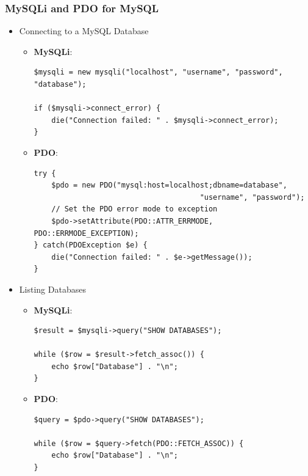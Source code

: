\documentclass[11pt]{article}
\begin{document}
\subsubsection{MySQLi and PDO for MySQL}
\label{sec:org78cc2f3}
\begin{itemize}
\item Connecting to a MySQL Database
\label{sec:org22497bb}
\begin{itemize}
\item \textbf{MySQLi}:

\begin{verbatim}
$mysqli = new mysqli("localhost", "username", "password", "database");

if ($mysqli->connect_error) {
    die("Connection failed: " . $mysqli->connect_error);
}
\end{verbatim}

\item \textbf{PDO}:

\begin{verbatim}
try {
    $pdo = new PDO("mysql:host=localhost;dbname=database",
                                      "username", "password");
    // Set the PDO error mode to exception
    $pdo->setAttribute(PDO::ATTR_ERRMODE, PDO::ERRMODE_EXCEPTION);
} catch(PDOException $e) {
    die("Connection failed: " . $e->getMessage());
}
\end{verbatim}
\end{itemize}

\item Listing Databases
\label{sec:org1a90090}
\begin{itemize}
\item \textbf{MySQLi}:

\begin{verbatim}
$result = $mysqli->query("SHOW DATABASES");

while ($row = $result->fetch_assoc()) {
    echo $row["Database"] . "\n";
}
\end{verbatim}

\item \textbf{PDO}:

\begin{verbatim}
$query = $pdo->query("SHOW DATABASES");

while ($row = $query->fetch(PDO::FETCH_ASSOC)) {
    echo $row["Database"] . "\n";
}
\end{verbatim}
\end{itemize}
\end{itemize}
\end{document}
